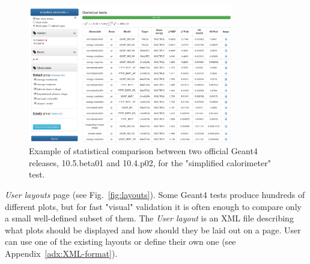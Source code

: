 \begin{figure}[h]
    \centering
    \includegraphics[width=0.8\textwidth,clip]{statcomparison.png}
    \caption{Example of statistical comparison between two official Geant4 releases, 10.5.beta01 and 10.4.p02, for the "simplified calorimeter" test.}
    \label{fig:statcomparison}
\end{figure}

\textit{User layouts} page (see Fig.~\ref{fig:layouts}). Some Geant4 tests produce hundreds of different plots, but for fast "visual" validation it is often enough to compare only a small well-defined subset of them. The \textit{User layout} is an XML file describing what plots should be displayed and how should they be laid out on a page. User can use one of the existing layouts or define their own one (see Appendix~\ref{adx:XML-format}).
